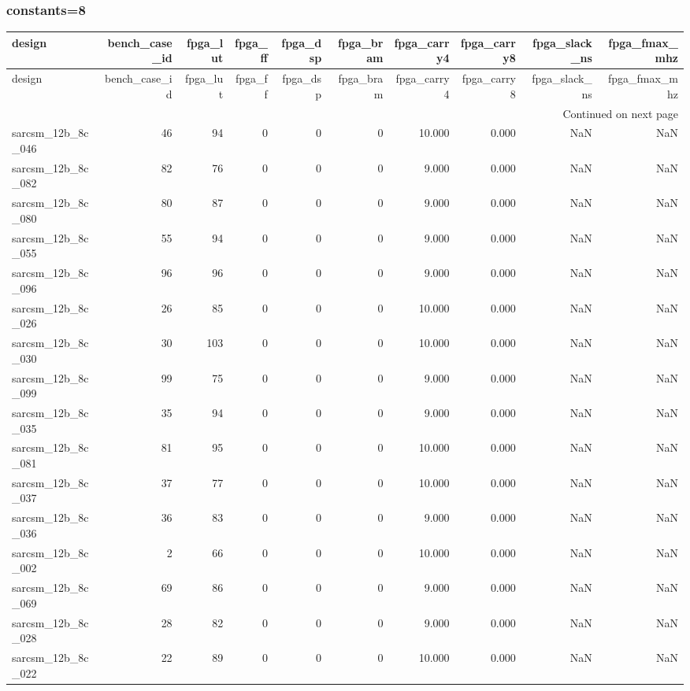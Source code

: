 \documentclass{article}
\begin{document}
\subsubsection*{constants=8}
\begin{longtable}{lrrrrrrrrr}
\toprule
design & bench\_case\_id & fpga\_lut & fpga\_ff & fpga\_dsp & fpga\_bram & fpga\_carry4 & fpga\_carry8 & fpga\_slack\_ns & fpga\_fmax\_mhz \\
\midrule
\endfirsthead
\toprule
design & bench\_case\_id & fpga\_lut & fpga\_ff & fpga\_dsp & fpga\_bram & fpga\_carry4 & fpga\_carry8 & fpga\_slack\_ns & fpga\_fmax\_mhz \\
\midrule
\endhead
\midrule
\multicolumn{10}{r}{Continued on next page} \\
\midrule
\endfoot
\bottomrule
\endlastfoot
sarcsm\_12b\_8c\_046 & 46 & 94 & 0 & 0 & 0 & 10.000 & 0.000 & NaN & NaN \\
sarcsm\_12b\_8c\_082 & 82 & 76 & 0 & 0 & 0 & 9.000 & 0.000 & NaN & NaN \\
sarcsm\_12b\_8c\_080 & 80 & 87 & 0 & 0 & 0 & 9.000 & 0.000 & NaN & NaN \\
sarcsm\_12b\_8c\_055 & 55 & 94 & 0 & 0 & 0 & 9.000 & 0.000 & NaN & NaN \\
sarcsm\_12b\_8c\_096 & 96 & 96 & 0 & 0 & 0 & 9.000 & 0.000 & NaN & NaN \\
sarcsm\_12b\_8c\_026 & 26 & 85 & 0 & 0 & 0 & 10.000 & 0.000 & NaN & NaN \\
sarcsm\_12b\_8c\_030 & 30 & 103 & 0 & 0 & 0 & 10.000 & 0.000 & NaN & NaN \\
sarcsm\_12b\_8c\_099 & 99 & 75 & 0 & 0 & 0 & 9.000 & 0.000 & NaN & NaN \\
sarcsm\_12b\_8c\_035 & 35 & 94 & 0 & 0 & 0 & 9.000 & 0.000 & NaN & NaN \\
sarcsm\_12b\_8c\_081 & 81 & 95 & 0 & 0 & 0 & 10.000 & 0.000 & NaN & NaN \\
sarcsm\_12b\_8c\_037 & 37 & 77 & 0 & 0 & 0 & 10.000 & 0.000 & NaN & NaN \\
sarcsm\_12b\_8c\_036 & 36 & 83 & 0 & 0 & 0 & 9.000 & 0.000 & NaN & NaN \\
sarcsm\_12b\_8c\_002 & 2 & 66 & 0 & 0 & 0 & 10.000 & 0.000 & NaN & NaN \\
sarcsm\_12b\_8c\_069 & 69 & 86 & 0 & 0 & 0 & 9.000 & 0.000 & NaN & NaN \\
sarcsm\_12b\_8c\_028 & 28 & 82 & 0 & 0 & 0 & 9.000 & 0.000 & NaN & NaN \\
sarcsm\_12b\_8c\_022 & 22 & 89 & 0 & 0 & 0 & 10.000 & 0.000 & NaN & NaN \\

\end{longtable}
\end{document}
